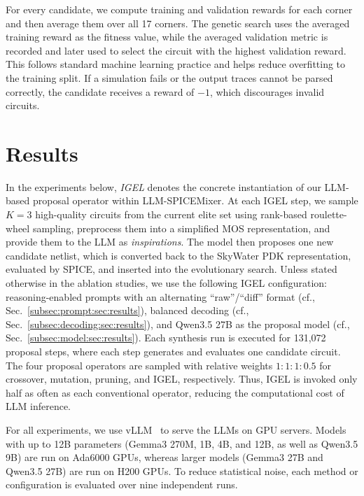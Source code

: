 \documentclass[sigconf,pbalance]{acmart_modified}
\newcommand{\squeezeSection}{}
\newcommand{\llmspm}{LLM-SPICE\-Mixer}
\begin{document}
For every candidate, we compute training and validation rewards for each corner and then average them over all 17 corners. The genetic search uses the averaged training reward as the fitness value, while the averaged validation metric is recorded and later used to select the circuit with the highest validation reward. This follows standard machine learning practice and helps reduce overfitting to the training split. If a simulation fails or the output traces cannot be parsed correctly, the candidate receives a reward of $-1$, which discourages invalid circuits.
\squeezeSection\section{Results}
\label{sec:results}
In the experiments below, \emph{IGEL} denotes the concrete instantiation of our LLM-based proposal operator within \llmspm{}. At each IGEL step, we sample $K=3$ high-quality circuits from the current elite set using rank-based roulette-wheel sampling, preprocess them into a simplified MOS representation, and provide them to the LLM as \emph{inspirations}. The model then proposes one new candidate netlist, which is converted back to the SkyWater PDK representation, evaluated by SPICE, and inserted into the evolutionary search. Unless stated otherwise in the ablation studies, we use the following IGEL configuration: reasoning-enabled prompts with an alternating ``raw''/``diff'' format (cf., Sec.~\ref{subsec:prompt:sec:results}), balanced decoding (cf., Sec.~\ref{subsec:decoding:sec:results}), and Qwen3.5 27B as the proposal model (cf., Sec.~\ref{subsec:model:sec:results}). Each synthesis run is executed for 131{,}072 proposal steps, where each step generates and evaluates one candidate circuit. The four proposal operators are sampled with relative weights $1:1:1:0.5$ for crossover, mutation, pruning, and IGEL, respectively. Thus, IGEL is invoked only half as often as each conventional operator, reducing the computational cost of LLM inference.

For all experiments, we use vLLM~\cite{kwon2023efficient} to serve the LLMs on GPU servers. Models with up to 12B parameters (Gemma3 270M, 1B, 4B, and 12B, as well as Qwen3.5 9B) are run on Ada6000 GPUs, whereas larger models (Gemma3 27B and Qwen3.5 27B) are run on H200 GPUs. To reduce statistical noise, each method or configuration is evaluated over nine independent runs.
\end{document}
